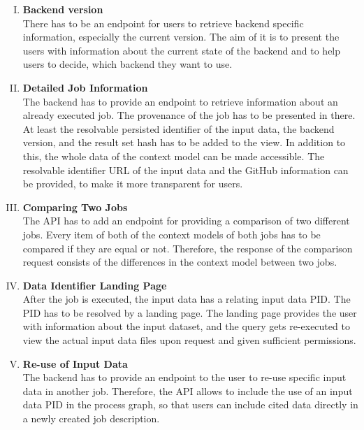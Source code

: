 \documentclass[draft,final]{vutinfth} %
\begin{document}
\begin{enumerate}[I.]
\item \textbf{Backend version} \\
	There has to be an endpoint for users to retrieve backend specific information, especially the current version. The aim of it is to present the users with information about the current state of the backend and to help users to decide, which backend they want to use. 

\item \textbf{Detailed Job Information} \\
	The backend has to provide an endpoint to retrieve information about an already executed job. The provenance of the job has to be presented in there. At least the resolvable persisted identifier of the input data, the backend version, and the result set hash has to be added to the view. In addition to this, the whole data of the context model can be made accessible. The resolvable identifier URL of the input data and the GitHub information can be provided, to make it more transparent for users.   

\item \textbf{Comparing Two Jobs} \\
	The API has to add an endpoint for providing a comparison of two different jobs.  Every item of both of the context models of both jobs has to be compared if they are equal or not. Therefore, the response of the comparison request consists of the differences in the context model between two jobs.

\item \textbf{Data Identifier Landing Page} \\
	After the job is executed, the input data has a relating input data PID. The PID has to be resolved by a landing page. The landing page provides the user with information about the input dataset, and the query gets re-executed to view the actual input data files upon request and given sufficient permissions.
    
\item \textbf{Re-use of Input Data} \\
	The backend has to provide an endpoint to the user to re-use specific input data in another job. Therefore, the API allows to include the use of an input data PID in the process graph, so that users can include cited data directly in a newly created job description.   
\end{enumerate}
\end{document}
